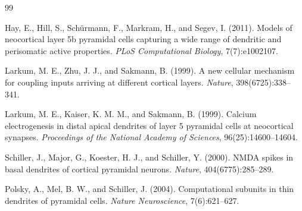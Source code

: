 \documentclass{article}
\begin{document}
\clearpage

\begin{thebibliography}{99}

\small

\item[] Hay, E., Hill, S., Sch{\"u}rmann, F., Markram, H., and Segev, I. (2011). Models of neocortical layer 5b pyramidal cells capturing a wide range of dendritic and perisomatic active properties. \textit{PLoS Computational Biology}, 7(7):e1002107.

\item[] Larkum, M. E., Zhu, J. J., and Sakmann, B. (1999). A new cellular mechanism for coupling inputs arriving at different cortical layers. \textit{Nature}, 398(6725):338--341.

\item[] Larkum, M. E., Kaiser, K. M. M., and Sakmann, B. (1999). Calcium electrogenesis in distal apical dendrites of layer 5 pyramidal cells at neocortical synapses. \textit{Proceedings of the National Academy of Sciences}, 96(25):14600--14604.

\item[] Schiller, J., Major, G., Koester, H. J., and Schiller, Y. (2000). NMDA spikes in basal dendrites of cortical pyramidal neurons. \textit{Nature}, 404(6775):285--289.

\item[] Polsky, A., Mel, B. W., and Schiller, J. (2004). Computational subunits in thin dendrites of pyramidal cells. \textit{Nature Neuroscience}, 7(6):621--627.

\end{thebibliography}
\end{document}
